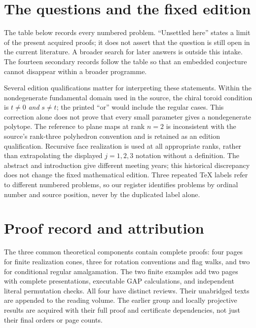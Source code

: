 \documentclass[11pt,a4paper]{article}
\begin{document}
\section{The questions and the fixed edition}

The table below records every numbered problem. ``Unsettled
here'' states a limit of the present acquired proofs; it
does not assert that the question is still open in the
current literature. A broader search for later answers
is outside this intake. The fourteen secondary records
follow the table so that an embedded conjecture cannot
disappear within a broader programme.




Several edition qualifications matter for interpreting
these statements. Within the nondegenerate fundamental
domain used in the source, the chiral toroid condition is
$t\ne0$ \emph{and} $s\ne t$; the printed ``or'' would
include the regular cases. This correction alone does not
prove that every small parameter gives a nondegenerate
polytope. The reference to plane maps at rank $n=2$ is
inconsistent with the source's rank-three polyhedron
convention and is retained as an edition qualification.
Recursive face realization is used at all appropriate
ranks, rather than extrapolating the displayed $j=1,2,3$
notation without a definition. The abstract and
introduction give different meeting years; this historical
discrepancy does not change the fixed mathematical edition.
Three repeated TeX labels refer to different numbered
problems, so our register identifies problems by ordinal
number and source position, never by the duplicated label
alone.

\section{Proof record and attribution}

The three common theoretical components contain complete
proofs: four pages for finite realization cones, three
for rotation conventions and flag walks, and two for
conditional regular amalgamation. The two finite examples
add two pages with complete presentations, executable GAP
calculations, and independent literal permutation checks.
All four have distinct reviews. Their unabridged texts
are appended to the reading volume. The earlier group and
locally projective results are acquired with their full
proof and certificate dependencies, not just their final
orders or page counts.
\end{document}
